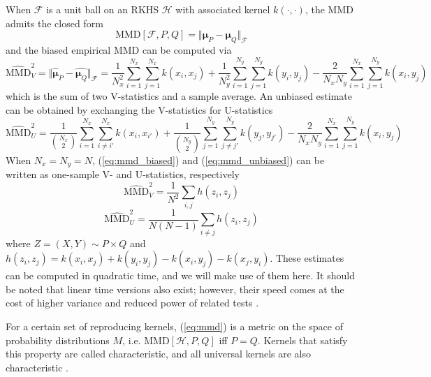 \documentclass[a4paper,11pt]{article}
\begin{document}
When $\mathcal{F}$ is a unit ball on an RKHS $\mathcal{H}$ with associated kernel $k(\cdot, \cdot)$, the MMD admits the closed form
\begin{equation}
        \mathrm{MMD}[\mathcal{F}, P, Q] = \Vert \mathbf{\mu}_{P}-\mathbf{\mu}_{Q} \Vert_{\mathcal{F}}
    \label{eq:mmd_closed}
\end{equation}
and the biased empirical MMD can be computed via
\begin{equation}
        \widehat{\mathrm{MMD}}_{V}^{2} = \Vert \hat{\mathbf{\mu}}_{P}-\hat{\mathbf{\mu}_{Q}} \Vert_{\mathcal{F}} = \frac{1}{N_{x}^{2}} \sum_{i=1}^{N_{x}} \sum_{j=1}^{N_{x}} k\left(x_{i}, x_{j}\right)+\frac{1}{N_{y}^{2}} \sum_{i=1}^{N_{y}} \sum_{j=1}^{N_{y}} k\left(y_{i}, y_{j}\right)
        -\frac{2}{N_{x} N_{y}} \sum_{i=1}^{N_{x}} \sum_{j=1}^{N_{y}} k\left(x_{i}, y_{j}\right)
        \label{eq:mmd_biased}
\end{equation}
which is the sum of two V-statistics and a sample average. An unbiased estimate can be obtained by exchanging the V-statistics for U-statistics
\begin{equation}
    \widehat{\mathrm{MMD}}_{U}^{2} = \frac{1}{{N_{x}\choose 2}} \sum_{i = 1}^{N_{x}} \sum_{i \neq i'}^{N_{x}} k\left(x_{i}, x_{i'}\right)+\frac{1}{{N_{y}\choose 2}} \sum_{j = 1}^{N_{y}} \sum_{j \neq j'}^{N_{y}} k\left(y_{j}, y_{j'}\right)-\frac{2}{N_{x}N_{y}} \sum_{i = 1}^{N_{x}} \sum_{j = 1}^{N_{y}} k\left(x_{i}, y_{j}\right)
    \label{eq:mmd_unbiased}
\end{equation}
When $N_{x}=N_{y}=N$, (\ref{eq:mmd_biased}) and (\ref{eq:mmd_unbiased}) can be written as one-sample V- and U-statistics, respectively
\begin{equation}
    \widehat{\mathrm{MMD}}_{V}^{2} = \frac{1}{N^{2}} \sum_{i, j} h(z_{i}, z_{j})
    \label{eq:mmd_biased_v}
\end{equation}
\begin{equation}
    \widehat{\mathrm{MMD}}_{U}^{2} = \frac{1}{N(N-1)} \sum_{i \neq j} h(z_{i}, z_{j})
    \label{eq:mmd_unbiased_u}
\end{equation}
where $Z = (X, Y) \sim P \times Q$ and $h(z_{i}, z_{j})=k(x_{i}, x_{j}) + k(y_{i}, y_{j}) - k(x_{i}, y_{j}) - k(x_{j}, y_{i})$. These estimates can be computed in quadratic time, and we will make use of them here. It should be noted that linear time versions also exist; however, their speed comes at the cost of higher variance and reduced power of related tests \cite{gretton_kernel_2012}.

For a certain set of reproducing kernels, (\ref{eq:mmd}) is a metric on the space of probability distributions $M$, i.e. $\mathrm{MMD}[\mathcal{H}, P, Q]$ iff $P=Q$. Kernels that satisfy this property are called characteristic, and all universal kernels are also characteristic \cite{sriperumbudur_hilbert_nodate}.
\end{document}
